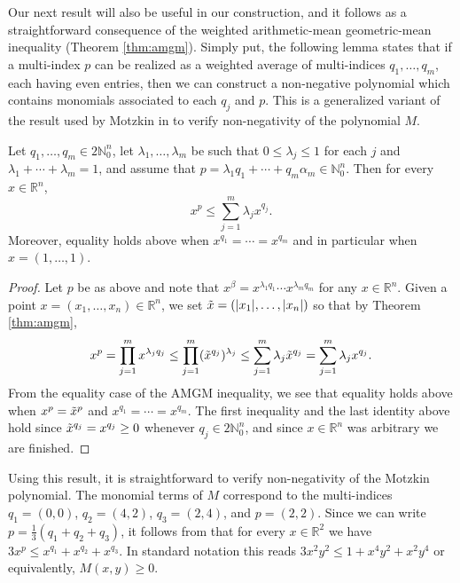 \documentclass[oneside,hidelinks,indentfirst,10pt]{book}
\begin{document}
Our next result will also be useful in our construction, and it follows as a straightforward consequence of the weighted arithmetic-mean geometric-mean inequality (Theorem \ref{thm:amgm}). Simply put, the following lemma states that if a multi-index \(p\) can be realized as a weighted average of multi-indices \(q_1,\dots,q_m\), each having even entries, then we can construct a non-negative polynomial which contains monomials associated to each \(q_j\) and \(p\). This is a generalized variant of the result used by Motzkin in \cite{Motzkin} to verify non-negativity of the polynomial \(M\).

\begin{lem}\label{lem:amgm}
Let \(q_1,\dots,q_m\in 2\mathbb{N}_0^n\), let \(\lambda_1,\dots,\lambda_m\) be such that \(0\leq \lambda_j\leq 1\) for each \(j\) and \(\lambda_1+\cdots+\lambda_m=1\), and assume that \(p=\lambda_1q_1+\cdots+q_m\alpha_m\in \mathbb{N}_0^n\). Then for every \(x\in\mathbb{R}^n\),
\[
    x^p\leq \sum_{j=1}^m \lambda_jx^{q_j}.
\]
Moreover, equality holds above when \(x^{q_1}=\cdots=x^{q_m}\) and in particular when \(x=(1,\dots,1)\).
\end{lem}


\begin{proof}
Let \(p\) be as above and note that \(x^\beta=x^{\lambda_1q_1}\cdots x^{\lambda_mq_m}\) for any \(x\in\mathbb{R}^n\). Given a point \(x=(x_1,\dots,x_n)\in\mathbb{R}^n\), we set \(\Tilde{x}=(|x_1|,\dots,|x_n|)\) so that by Theorem \ref{thm:amgm},
\[
    x^p= \prod_{j=1}^mx^{\lambda_jq_j}\leq \prod_{j=1}^m(\Tilde{x}^{q_j})^{\lambda_j}\leq \sum_{j=1}^m\lambda_j\Tilde{x}^{q_j}=\sum_{j=1}^m\lambda_jx^{q_j}.
\]
From the equality case of the AMGM inequality, we see that equality holds above when \(x^p=\Tilde{x}^p\) and \(x^{q_1}=\cdots=x^{q_m}\). The first inequality and the last identity above hold since \(\Tilde{x}^{q_j}=x^{q_j}\geq0\) whenever \(q_j\in 2\mathbb{N}_0^n\), and since \(x\in\mathbb{R}^n\) was arbitrary we are finished.
\end{proof}


Using this result, it is straightforward to verify non-negativity of the Motzkin polynomial. The monomial terms of \(M\) correspond to the multi-indices \(q_1=(0,0)\), \(q_2=(4,2)\), \(q_3=(2,4)\), and \(p=(2,2)\). Since we can write \(p=\frac{1}{3}(q_1+q_2+q_3)\), it follows from  that for every \(x\in\mathbb{R}^2\) we have \(3x^p\leq x^{q_1}+x^{q_2}+x^{q_3}\). In standard notation this reads \(3x^2y^2\leq 1+x^4y^2+x^2y^4\) or equivalently, \(M(x,y)\geq0\).
\end{document}
